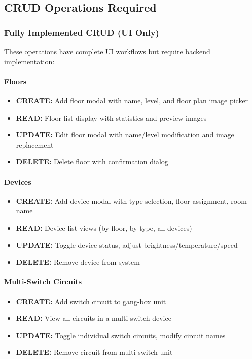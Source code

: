 \documentclass[12pt,a4paper]{article}
\begin{document}
\subsection{CRUD Operations Required}

\subsubsection{Fully Implemented CRUD (UI Only)}
These operations have complete UI workflows but require backend implementation:

\paragraph{Floors}
\begin{itemize}[leftmargin=*]
    \item \textbf{CREATE:} Add floor modal with name, level, and floor plan image picker
    \item \textbf{READ:} Floor list display with statistics and preview images
    \item \textbf{UPDATE:} Edit floor modal with name/level modification and image replacement
    \item \textbf{DELETE:} Delete floor with confirmation dialog
\end{itemize}

\paragraph{Devices}
\begin{itemize}[leftmargin=*]
    \item \textbf{CREATE:} Add device modal with type selection, floor assignment, room name
    \item \textbf{READ:} Device list views (by floor, by type, all devices)
    \item \textbf{UPDATE:} Toggle device status, adjust brightness/temperature/speed
    \item \textbf{DELETE:} Remove device from system
\end{itemize}

\paragraph{Multi-Switch Circuits}
\begin{itemize}[leftmargin=*]
    \item \textbf{CREATE:} Add switch circuit to gang-box unit
    \item \textbf{READ:} View all circuits in a multi-switch device
    \item \textbf{UPDATE:} Toggle individual switch circuits, modify circuit names
    \item \textbf{DELETE:} Remove circuit from multi-switch unit
\end{itemize}
\end{document}
